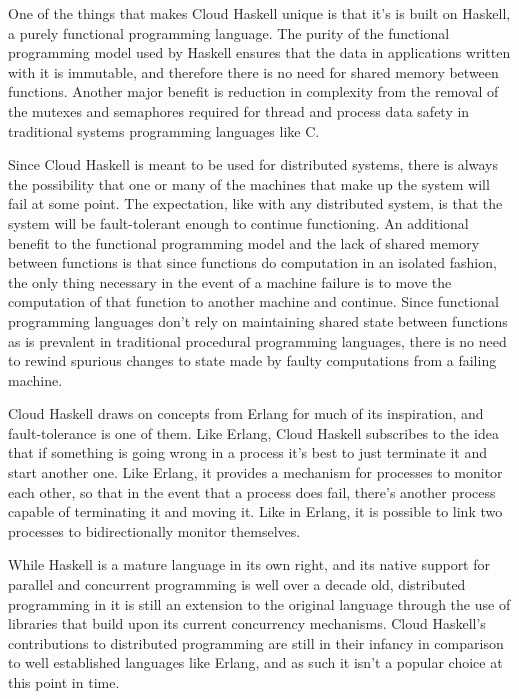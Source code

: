 \documentclass[10pt,a4paper,twocolumn]{article}
\begin{document}
One of the things that makes Cloud Haskell unique is that it's is built on
Haskell, a purely functional programming language. The purity of the functional
programming model used by Haskell ensures that the data in applications written
with it is immutable, and therefore there is no need for shared memory between
functions. Another major benefit is reduction in complexity from the removal of
the mutexes and semaphores required for thread and process data safety in
traditional systems programming languages like C.

Since Cloud Haskell is meant to be used for distributed systems, there is always
the possibility that one or many of the machines that make up the system will
fail at some point. The expectation, like with any distributed system, is that
the system will be fault-tolerant enough to continue functioning. An additional
benefit to the functional programming model and the lack of shared memory
between functions is that since functions do computation in an isolated fashion,
the only thing necessary in the event of a machine failure is to move the
computation of that function to another machine and continue. Since functional
programming languages don't rely on maintaining shared state between functions
as is prevalent in traditional procedural programming languages, there is no
need to rewind spurious changes to state made by faulty computations from a
failing machine.

Cloud Haskell draws on concepts from Erlang for much of its inspiration, and
fault-tolerance is one of them. Like Erlang, Cloud Haskell subscribes to the
idea that if something is going wrong in a process it's best to just terminate
it and start another one. Like Erlang, it provides a mechanism for processes to
monitor each other, so that in the event that a process does fail, there's
another process capable of terminating it and moving it. Like in Erlang, it is
possible to link two processes to bidirectionally monitor themselves.
\cite{cloudhaskell}

While Haskell is a mature language in its own right, and its native support for
parallel and concurrent programming is well over a decade old, distributed
programming in it is still an extension to the original language through the use
of libraries that build upon its current concurrency mechanisms. Cloud Haskell's
contributions to distributed programming are still in their infancy in
comparison to well established languages like Erlang, and as such it isn't a
popular choice at this point in time.
\end{document}
